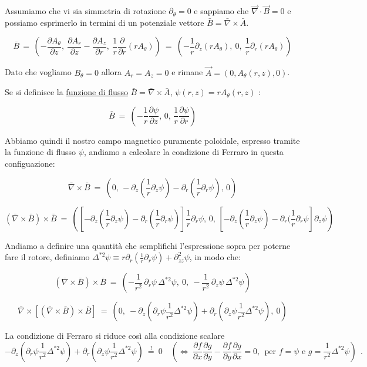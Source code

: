 Assumiamo che vi sia simmetria di rotazione $\partial_\theta = 0$ e sappiamo che $\vec \nabla \cdot \vec B = 0$ e possiamo esprimerlo in termini di un potenziale vettore $\bar B = \bar \nabla \times \bar A$.

\[\bar B\, =\, \left(-\frac{\partial A_\theta}{\partial z},\ \frac{\partial A_r}{\partial z}-\frac{\partial A_z}{\partial r},\ \frac{1}{r}\frac{\partial}{\partial r} (rA_\theta)\right)\ =\ \left(-\frac{1}{r} \partial_z (rA_\theta),\ 0,\ \frac{1}{r}\partial_r (rA_\theta)\right)\]

Dato che vogliamo $B_\theta = 0$ allora $A_r=A_z=0$ e rimane $\vec A = (0, A_\theta(r,z), 0)$.

Se si definisce la \underline{funzione di flusso} $\bar B = \bar \nabla \times \bar A$, $\boxed{\psi(r,z)=rA_\theta (r,z)}$ :

\[\bar B\ =\ \left(-\frac{1}{r} \frac{\partial \psi}{\partial z},\, 0,\, \frac{1}{r}\frac{\partial \psi}{\partial r}\right)\]

Abbiamo quindi il nostro campo magnetico puramente poloidale, espresso tramite la funzione di flusso $\psi$, andiamo a calcolare la condizione di Ferraro in questa configuazione: 

\[\bar \nabla \times \bar B\ =\ \left(0,\, -\partial_z (\frac{1}{r} \partial_z \psi)-\partial_r (\frac{1}{r}\partial_r \psi),\, 0\right)\]

\[(\bar \nabla \times \bar B)\times \bar B  
\ =\ \left(\left[-\partial_z(\frac{1}{r}\partial_z \psi)-\partial_r (\frac{1}{r}\partial_r \psi)\right]\frac{1}{r}\partial_r \psi,\, 0,\, \left[-\partial_z (\frac{1}{r} \partial_z \psi)-\partial_r (\frac{1}{r}\partial_r \psi \right] \partial_z\psi\right)\]

Andiamo a definire una quantità che semplifichi l'espressione sopra per poterne fare il rotore, definiamo $\boxed{\Delta^{*2} \psi \equiv r\partial_r \left(\frac{1}{r}\partial_r \psi\right) + \partial^2_{zz}\psi}$, in modo che:

\[(\bar \nabla \times \bar B)\times \bar B  
\ =\ \left(-\frac{1}{r^2}\,\partial_r \psi \,\Delta^{*2}\psi,\ 0,\ -\frac{1}{r^2}\, \partial_z \psi\,\Delta^{*2} \psi\right)\]

\[\bar \nabla \times \left[(\bar \nabla \times \bar B)\times \bar B\right]\ =\ \left(0,\ -\partial_z (\partial_r \psi \frac{1}{r^2}\Delta^{*2} \psi)+\partial_r (\partial_z \psi \frac{1}{r^2}\Delta^{*2} \psi),\ 0\right)\]

La condizione di Ferraro si riduce così alla condizione scalare \[-\partial_z (\partial_r \psi \frac{1}{r^2}\Delta^{*2} \psi)+\partial_r (\partial_z \psi \frac{1}{r^2}\Delta^{*2} \psi)\ \overset{!}{=}\ 0
\quad \left(\iff\ \frac{\partial f}{\partial x} \frac{\partial g}{\partial y} - \frac{\partial f}{\partial y} \frac{\partial g}{\partial x}=0,\ \  \text{per } f=\psi \text{ e } g=\frac{1}{r^2}\Delta^{*2} \psi \right)\ \ .\]

